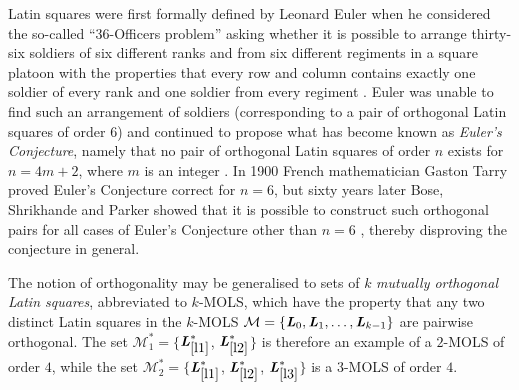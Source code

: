 \documentclass[11pt, a4paper]{article}
\newcommand{\lat}{Latin square}
\renewcommand{\l}{ \mbox{\bf \emph{L}} }
\newcommand{\lref}[1]{$\l_{\ref{#1}}^*$}
\begin{document}
Latin squares were first formally defined by Leonard Euler when he considered the so-called ``36-Officers problem'' asking whether it is possible to arrange thirty-six soldiers of six different ranks and from six different regiments in a square platoon with the properties that every row and column contains exactly one soldier of every rank and one soldier from every regiment \cite{euler}.  Euler was unable to find such an arrangement of soldiers (corresponding to a pair of orthogonal \lat s of order 6) and continued to propose what has become known as \emph{Euler's Conjecture}, namely that no pair of orthogonal \lat s of order $n$ exists for $n=4m+2$, where $m$ is an integer \cite{euler}. In 1900 French mathematician Gaston Tarry proved Euler's Conjecture correct for $n=6$, but sixty years later  Bose, Shrikhande and Parker showed  that it is possible to construct such orthogonal pairs for all cases of Euler's Conjecture other than $n=6$ \cite{bose}, thereby disproving the conjecture in general.

The notion of orthogonality may be generalised to sets of $k$ \emph{mutually orthogonal Latin squares}, abbreviated to $k$-MOLS, which have the property that any two distinct \lat s in the $k$-MOLS $\mathcal{ M} = \{\l_0, \l_1, \ldots, \l_{k-1}\}$ are pairwise orthogonal. The set $\mathcal{M}_1^*= \{$\lref{l1}, \lref{l2}$\}$ is therefore an example of a $2$-MOLS of order $4$, while the set $\mathcal{M}_2^* = \{$\lref{l1}, \lref{l2}, \lref{l3}$\}$ is a 3-MOLS of order $4$.
 
\end{document}
